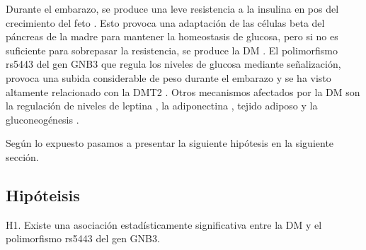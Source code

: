 Durante el embarazo, se produce una leve resistencia a la insulina en pos del crecimiento del feto \cite{Kalhan1999}. Esto provoca una adaptación de las células beta del páncreas de la madre para mantener la homeostasis de glucosa, pero si no es suficiente para sobrepasar la resistencia, se produce la DM \cite{Moyce2018}. El polimorfismo rs5443  del gen GNB3 que regula los niveles de glucosa mediante señalización, provoca una subida considerable de peso durante el embarazo y se ha visto altamente relacionado con la DMT2 \cite{Rizvi2016}. Otros mecanismos afectados por la DM son la regulación de niveles de leptina \cite{Perez2020, Xu2014}, la adiponectina \cite{Plows2018, Xu2014}, tejido adiposo \cite{Plows2018, Desoye2021} y la gluconeogénesis \cite{Catalano2014}.

Según lo expuesto pasamos a presentar la siguiente hipótesis en la siguiente sección.

\subsection{Hipóteisis}

H1. Existe una asociación estadísticamente significativa entre la DM y el polimorfismo rs5443 del gen GNB3.